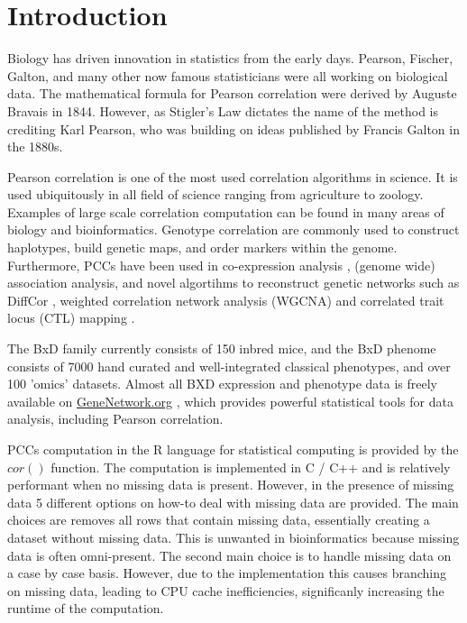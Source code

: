 \documentclass{bioinfo}
\begin{document}
\maketitle

\section{Introduction}
Biology has driven innovation in statistics from the early days. 
Pearson, Fischer, Galton, and many other now famous statisticians 
were all working on biological data. The mathematical formula 
for Pearson correlation were derived by Auguste Bravais in 1844. 
However, as Stigler's Law \citep{Stigler1980} dictates the name 
of the method is crediting Karl Pearson, who was building on 
ideas published by Francis Galton in the 1880s. 

Pearson correlation is one of the most used correlation algorithms in science. 
It is used ubiquitously in all field of science ranging from agriculture to 
zoology. Examples of large scale correlation computation can be found in many 
areas of biology and bioinformatics. Genotype correlation are commonly used to 
construct haplotypes, build genetic maps, and order markers within the genome. 
Furthermore, PCCs have been used in co-expression analysis \citep{Tesson:2010}, 
(genome wide) association analysis, and novel algortihms to reconstruct genetic 
networks such as DiffCor \citep{Fukushima:2013}, weighted correlation network 
analysis (WGCNA) \citep{Horvath:2008} and correlated trait locus (CTL) mapping 
\citep{Arends2016a}.

The BxD family currently consists of 150 inbred mice, and the BxD phenome consists 
of 7000 hand curated and well-integrated classical phenotypes, and over 100 'omics' 
datasets. Almost all BXD expression and phenotype data is freely available on 
\href{https://genenetwork.org/}{GeneNetwork.org} \citep{Sloan2016}, which provides 
powerful statistical tools for data analysis, including Pearson correlation.

PCCs computation in the R language for statistical computing \citep{R:2005} is 
provided by the $cor()$ function. The computation is implemented in C / C++ and 
is relatively performant when no missing data is present. However, 
in the presence of missing data 5 different options on how-to deal 
with missing data are provided. The main choices are removes all rows that 
contain missing data, essentially creating a dataset without missing data. This is 
unwanted in bioinformatics because missing data is often omni-present. 
The second main choice is to handle missing data on a case by case basis. However, 
due to the implementation this causes branching on missing data, leading to CPU 
cache inefficiencies, significanly increasing the runtime of the computation.
\end{document}
